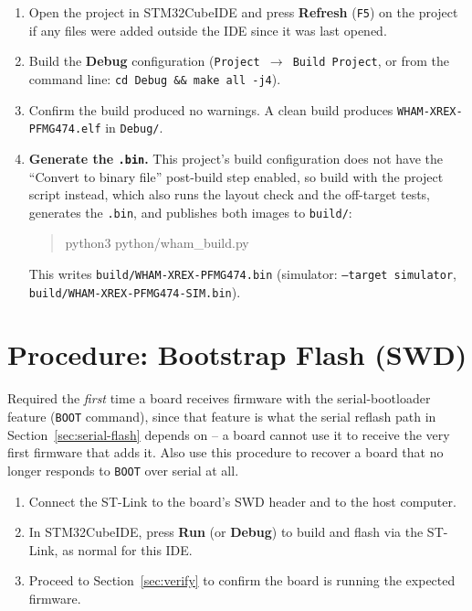 \documentclass[11pt]{article}
\newcommand{\code}[1]{\texttt{#1}}
\begin{document}
\begin{enumerate}[label=\arabic*.]
  \item Open the project in STM32CubeIDE and press \textbf{Refresh}
    (\code{F5}) on the project if any files were added outside the IDE
    since it was last opened.
  \item Build the \textbf{Debug} configuration (\code{Project~$\to$~Build
    Project}, or from the command line: \code{cd Debug \&\& make all -j4}).
  \item Confirm the build produced no warnings. A clean build produces
    \code{WHAM-XREX-PFMG474.elf} in \code{Debug/}.
  \item \textbf{Generate the \code{.bin}.} This project's build
    configuration does not have the ``Convert to binary file'' post-build
    step enabled, so build with the project script instead, which also
    runs the layout check and the off-target tests, generates the
    \code{.bin}, and publishes both images to \code{build/}:
\begin{quote}\ttfamily\small\raggedright
python3 python/wham\_build.py
\end{quote}
    This writes \code{build/WHAM-XREX-PFMG474.bin} (simulator:
    \code{--target simulator}, \code{build/WHAM-XREX-PFMG474-SIM.bin}).
\end{enumerate}

\section{Procedure: Bootstrap Flash (SWD)}
\label{sec:bootstrap}

Required the \emph{first} time a board receives firmware with the
serial-bootloader feature (\code{BOOT} command), since that feature is
what the serial reflash path in Section~\ref{sec:serial-flash} depends
on -- a board cannot use it to receive the very first firmware that adds
it. Also use this procedure to recover a board that no longer responds
to \code{BOOT} over serial at all.

\begin{enumerate}[label=\arabic*.]
  \item Connect the ST-Link to the board's SWD header and to the host
    computer.
  \item In STM32CubeIDE, press \textbf{Run} (or \textbf{Debug}) to build
    and flash via the ST-Link, as normal for this IDE.
  \item Proceed to Section~\ref{sec:verify} to confirm the board is
    running the expected firmware.
\end{enumerate}
\end{document}
